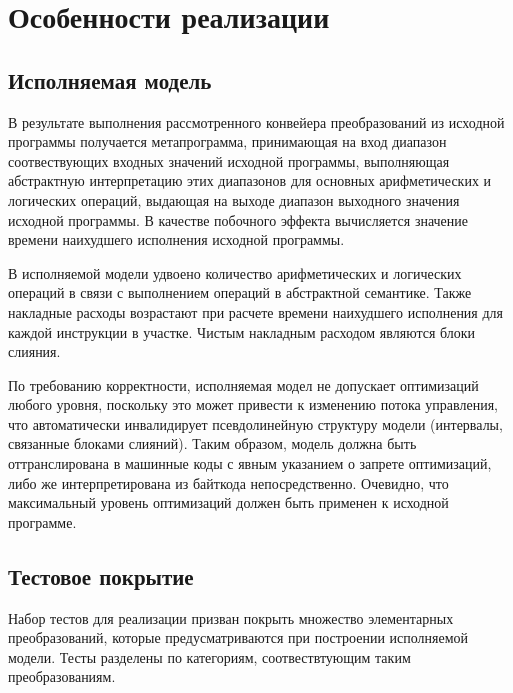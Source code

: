 \documentclass[12pt,a4paper]{article}
\begin{document}
\section{Особенности реализации}

\subsection{Исполняемая модель}

В результате выполнения рассмотренного конвейера преобразований из исходной программы получается метапрограмма, принимающая на вход диапазон соотвествующих входных значений исходной программы, выполняющая абстрактную интерпретацию этих диапазонов для основных арифметических и логических операций, выдающая на выходе диапазон выходного значения исходной программы. В качестве побочного эффекта вычисляется значение времени наихудшего исполнения исходной программы.

В исполняемой модели удвоено количество арифметических и логических операций в связи с выполнением операций в абстрактной семантике. Также накладные расходы возрастают при расчете времени наихудшего исполнения для каждой инструкции в участке. Чистым накладным расходом являются блоки слияния.

По требованию корректности, исполняемая модел не допускает оптимизаций любого уровня, поскольку это может привести к изменению потока управления, что автоматически инвалидирует псевдолинейную структуру модели (интервалы, связанные блоками слияний). Таким образом, модель должна быть оттранслирована в машинные коды с явным указанием о запрете оптимизаций, либо же интерпретирована из байткода непосредственно. Очевидно, что максимальный уровень оптимизаций должен быть применен к исходной программе.

\subsection{Тестовое покрытие}

Набор тестов для реализации призван покрыть множество элементарных преобразований, которые предусматриваются при построении исполняемой модели. Тесты разделены по категориям, соотвествтующим таким преобразованиям.
\end{document}
